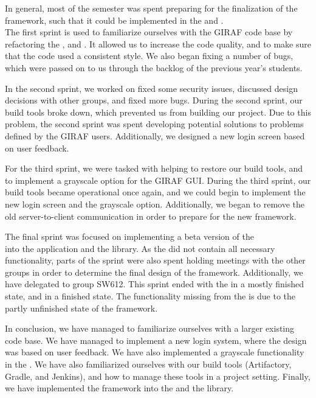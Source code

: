 In general, most of the semester was spent preparing for the finalization of the
 framework, such that it could be implemented in the
 and .\\
The first sprint is used to familiarize ourselves with the GIRAF code base by
refactoring the ,  and
. It allowed us to increase the code quality, and to make
sure that the code used a consistent style. We also began fixing a number of
bugs, which were passed on to us through the backlog of the previous year's
students.\nl



In the second sprint, we worked on fixed some security issues, discussed design
decisions with other groups, and fixed more bugs. During the second sprint, our
build tools broke down, which prevented us from building our project. Due to
this problem, the second sprint was spent developing potential solutions to
problems defined by the GIRAF users. Additionally, we designed a new login
screen based on user feedback.\nl

For the third sprint, we were tasked with helping to restore our build tools,
and to implement a grayscale option for the GIRAF GUI. During the third sprint,
our build tools became operational once again, and we could begin to implement
the new login screen and the grayscale option. Additionally, we began to remove
the old server-to-client communication in order to prepare for the new
 framework.\nl

The final sprint was focused on implementing a beta version of the
\\ into the  application and the
 library. As the  did not
contain all necessary functionality, parts of the sprint were also spent holding
meetings with the other groups in order to determine the final design of the
 framework. Additionally, we have delegated 
to group SW612. This sprint ended with the  in a mostly finished
state, and  in a finished state. The functionality
missing from the  is due to the partly unfinished state of the
 framework.\nl

In conclusion, we have managed to familiarize ourselves with a larger existing
code base. We have managed to implement a new login system, where the design was
based on user feedback. We have also implemented a grayscale
functionality in the . We have also familiarized ourselves
with our build tools (Artifactory, Gradle, and Jenkins), and how to manage these tools in
a project setting. Finally, we have implemented the  framework into
the  and the  library.
